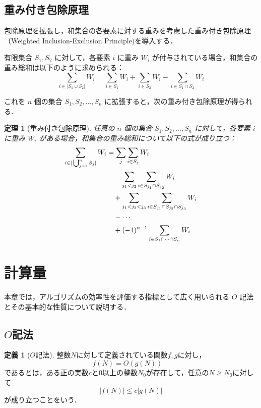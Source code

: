 \documentclass[12pt]{jsreport}
\theoremstyle{plain} %
\newtheorem{theorem}{定理}
\theoremstyle{definition}
\newtheorem{definition}{定義}
\begin{document}
\subsection{重み付き包除原理}

包除原理を拡張し，和集合の各要素に対する重みを考慮した重み付き包除原理（Weighted Inclusion-Exclusion Principle)を導入する．

有限集合 $S_1, S_2$ に対して，各要素 $i$ に重み $W_i$ が付与されている場合，和集合の重み総和は以下のように求められる：
\begin{equation}
    \sum_{i \in |S_1 \cup S_2|} W_i = \sum_{i \in S_1} W_i + \sum_{i \in S_2} W_i - \sum_{i \in S_1 \cap S_2} W_i
\end{equation}

これを $n$ 個の集合 $S_1, S_2, \dots, S_n$ に拡張すると，次の重み付き包除原理が得られる．
\begin{theorem}[重み付き包除原理]
    任意の $n$ 個の集合 $S_1, S_2, \dots, S_n$ に対して，各要素 $i$ に重み $W_i$ がある場合，和集合の重み総和について以下の式が成り立つ：
    \begin{align}
    \sum_{i \in |\bigcup_{j=1}^{n} S_j|} W_i \notag
    &= \sum_{j} \sum_{i \in S_j} W_i \notag \\
    &\quad - \sum_{j_1 < j_2} \sum_{i \in S_{j_1} \cap S_{j_2}} W_i \notag \\
    &\quad + \sum_{j_1 < j_2 < j_3} \sum_{i \in S_{j_1} \cap S_{j_2} \cap S_{j_3}} W_i \notag \\
    &\quad - \cdots \notag \\
    &\quad + (-1)^{n-1} \sum_{i \in S_1 \cap \cdots \cap S_n} W_i
    \end{align}
\end{theorem}
\section{計算量}

本章では，アルゴリズムの効率性を評価する指標として広く用いられる $O$ 記法とその基本的な性質について説明する\cite{book1}．

\subsection{$O$記法}

\begin{definition}[$O$記法]
    整数$N$に対して定義されている関数$f, g$に対し，
    \[
    f(N) = O(g(N)) \quad
    \]
    であるとは，ある正の実数$c$と0以上の整数$N_0$が存在して，任意の$N \geq N_0$に対して
    \[
    |f(N)| \leq c|g(N)|
    \]
    が成り立つことをいう．
\end{definition}
\end{document}
